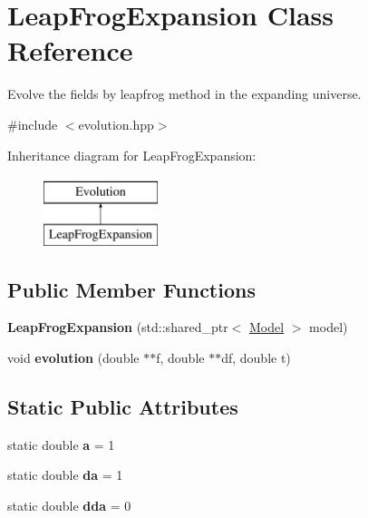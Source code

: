 \hypertarget{class_leap_frog_expansion}{}\section{Leap\+Frog\+Expansion Class Reference}
\label{class_leap_frog_expansion}


Evolve the fields by leapfrog method in the expanding universe.  




{\ttfamily \#include $<$evolution.\+hpp$>$}

Inheritance diagram for Leap\+Frog\+Expansion\+:\begin{figure}[H]
\begin{center}
\leavevmode
\includegraphics[height=2.000000cm]{class_leap_frog_expansion}
\end{center}
\end{figure}
\subsection*{Public Member Functions}
\begin{DoxyCompactItemize}
\item 
\mbox{\label{class_leap_frog_expansion_a8df00d93429f710e92165aea20e508de}} 
{\bfseries Leap\+Frog\+Expansion} (std\+::shared\+\_\+ptr$<$ \mbox{\hyperlink{class_model}{Model}} $>$ model)
\item 
\mbox{\label{class_leap_frog_expansion_a27854e0461bb73d00876439cf734aff6}} 
void {\bfseries evolution} (double $\ast$$\ast$f, double $\ast$$\ast$df, double t)
\end{DoxyCompactItemize}
\subsection*{Static Public Attributes}
\begin{DoxyCompactItemize}
\item 
\mbox{\label{class_leap_frog_expansion_a135b5611dda57d9b5c8e93696d7fc7d4}} 
static double {\bfseries a} = 1
\item 
\mbox{\label{class_leap_frog_expansion_aa99847d640fb05bd51e0a2398080ba1e}} 
static double {\bfseries da} = 1
\item 
\mbox{\label{class_leap_frog_expansion_a069435e3c2d81a3fbed7c786bc53a536}} 
static double {\bfseries dda} = 0
\end{DoxyCompactItemize}
